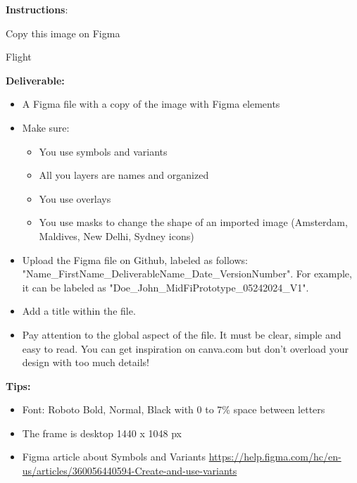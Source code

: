 \makeheaderfiles

\textbf{Instructions}:

Copy this image on Figma

Flight

\textbf{Deliverable:}

\begin{itemize}
\item A Figma file with a copy of the image with Figma elements
\item Make sure:
\begin{itemize}
\item You use symbols and variants
\item All you layers are names and organized
\item You use overlays
\item You use masks to change the shape of an imported image (Amsterdam, Maldives, New Delhi, Sydney icons)
\end{itemize}
\item Upload the Figma file on Github, labeled as follows: "Name\_FirstName\_DeliverableName\_Date\_VersionNumber". For example, it can be labeled as "Doe\_John\_MidFiPrototype\_05242024\_V1".
\item Add a title within the file.
\item Pay attention to the global aspect of the file. It must be clear, simple and easy to read. You can get inspiration on canva.com but don't overload your design with too much details!
\end{itemize}

\textbf{Tips:}

\begin{itemize}
\item Font: Roboto Bold, Normal, Black with 0 to 7\% space between letters
\item The frame is desktop 1440 x 1048 px
\item Figma article about Symbols and Variants \url{https://help.figma.com/hc/en-us/articles/360056440594-Create-and-use-variants}
\end{itemize}

